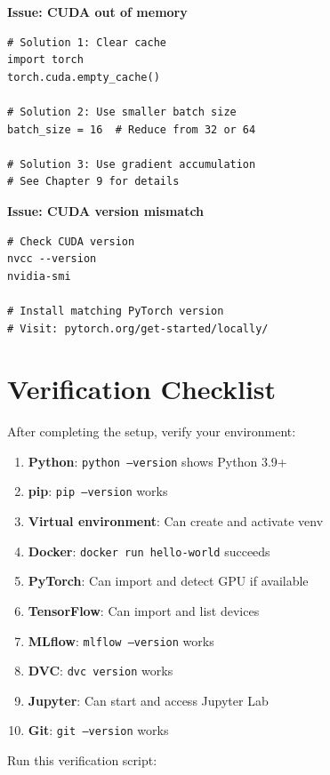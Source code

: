 \textbf{Issue: CUDA out of memory}
\begin{lstlisting}[style=python]
# Solution 1: Clear cache
import torch
torch.cuda.empty_cache()

# Solution 2: Use smaller batch size
batch_size = 16  # Reduce from 32 or 64

# Solution 3: Use gradient accumulation
# See Chapter 9 for details
\end{lstlisting}

\textbf{Issue: CUDA version mismatch}
\begin{lstlisting}[style=shell]
# Check CUDA version
nvcc --version
nvidia-smi

# Install matching PyTorch version
# Visit: pytorch.org/get-started/locally/
\end{lstlisting}

\section{Verification Checklist}

After completing the setup, verify your environment:

\begin{enumerate}
    \item \textbf{Python}: \texttt{python --version} shows Python 3.9+
    \item \textbf{pip}: \texttt{pip --version} works
    \item \textbf{Virtual environment}: Can create and activate venv
    \item \textbf{Docker}: \texttt{docker run hello-world} succeeds
    \item \textbf{PyTorch}: Can import and detect GPU if available
    \item \textbf{TensorFlow}: Can import and list devices
    \item \textbf{MLflow}: \texttt{mlflow --version} works
    \item \textbf{DVC}: \texttt{dvc version} works
    \item \textbf{Jupyter}: Can start and access Jupyter Lab
    \item \textbf{Git}: \texttt{git --version} works
\end{enumerate}

Run this verification script:

